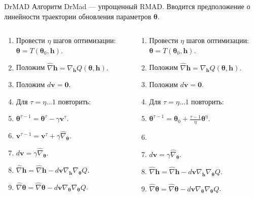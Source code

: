 \documentclass[10pt,pdf,utf8,russian,aspectratio=169]{beamer}
\begin{document}
\begin{frame}{DrMAD}
Алгоритм DrMad --- упрощенный RMAD. 
Вводится предположение о линейности траектории обновления параметров $\boldsymbol{\theta}$.
\begin{columns}
\begin{column}{0.5\textwidth}
\begin{enumerate}
\item Провести $\eta$ шагов оптимизации: $\boldsymbol{\theta} = T(\boldsymbol{\theta}_0, \mathbf{h})$.
\item Положим $\hat{\nabla} \mathbf{h} = \nabla_\mathbf{h} Q(\boldsymbol{\theta}, \mathbf{h}).$ 
\item Положим $d\mathbf{v} = \mathbf{0}.$
\item Для $\tau = \eta \dots 1 $ повторить:
\item $\boldsymbol{\theta}^{\tau-1} =  \boldsymbol{\theta}^{\tau} - \gamma\mathbf{v}^{\tau}.$
\item $\mathbf{v}^{\tau-1} =\mathbf{v}^{\tau} + \gamma \hat{\nabla}_{\boldsymbol{\theta}}.$
\item $d\mathbf{v} =  \gamma \hat{\nabla}_{\boldsymbol{\theta}}$.
\item $\hat{\nabla} \mathbf{h} =  \hat{\nabla} \mathbf{h} - d\mathbf{v}\nabla_{\mathbf{h}} \nabla_{\boldsymbol{\theta}} Q$.
\item $\hat{\nabla} \boldsymbol{\theta}  = \hat{\nabla} \boldsymbol{\theta}  - d\mathbf{v}\nabla_{\boldsymbol{\theta}} \nabla_{\boldsymbol{\theta}} Q$.
\end{enumerate}
\end{column}
\begin{column}{0.5\textwidth}
\begin{enumerate}
\item Провести $\eta$ шагов оптимизации: $\boldsymbol{\theta} = T(\boldsymbol{\theta}_0, \mathbf{h})$.
\item Положим $\hat{\nabla} \mathbf{h} = \nabla_\mathbf{h} Q(\boldsymbol{\theta}, \mathbf{h}).$ 
\item Положим $d\mathbf{v} = \mathbf{0}.$
\item Для $\tau = \eta \dots 1 $ повторить:
\item $\boldsymbol{\theta}^{\tau-1} = \boldsymbol{\theta}_0 + \frac{\tau-1}{\eta} \boldsymbol{\theta}^{\eta}.$
\item ~
\item $d\mathbf{v} =  \gamma \hat{\nabla}_{\boldsymbol{\theta}}$.
\item $\hat{\nabla} \mathbf{h} =  \hat{\nabla} \mathbf{h} - d\mathbf{v}\nabla_{\mathbf{h}} \nabla_{\boldsymbol{\theta}} Q$.
\item $\hat{\nabla} \boldsymbol{\theta}  = \hat{\nabla} \boldsymbol{\theta}  - d\mathbf{v}\nabla_{\boldsymbol{\theta}} \nabla_{\boldsymbol{\theta}} Q$.
\end{enumerate}
\end{column}
\end{columns}
\end{frame}
\end{document}
